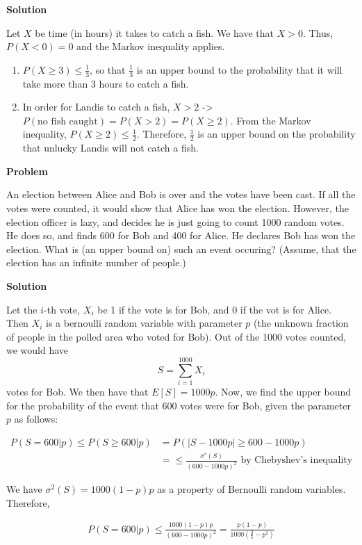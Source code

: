 \documentclass[11pt]{article}
\newcounter{problem}
\newcounter{solution}
\newcommand\Problem{%
  \stepcounter{problem}%
  \textbf{Problem \theproblem}~%
  \setcounter{solution}{0}%
}
\newcommand\TheSolution{%
  \textbf{Solution}\:\:%
}
\begin{document}
  \TheSolution
  Let $X$ be time (in hours) it takes to catch a fish. We have that $X>0$. Thus,
  $P(X<0)=0$ and the Markov inequality applies.
  \begin{enumerate}
  \item $P(X\geq 3)\leq \frac{1}{3}$, so that $\frac{1}{3}$ is an upper bound to
    the probability that it will take more than 3 hours to catch a fish.
  \item In order for Landis to catch a fish, $X > 2$ -> $P(\text{no fish
      caught}) = P(X>2) = P(X \geq 2)$. From the Markov inequality, $P(X \geq 2)
    \leq \frac{1}{2}$. Therefore, $\frac{1}{2}$ is an upper bound on the
    probability that unlucky Landis will not catch a fish.
  \end{enumerate}

  \newpage
  \Problem
  An election between Alice and Bob is over and the votes have been cast. If all
  the votes were counted, it would show that Alice has won the election. However,
  the election officer is lazy, and decides he is just going to count 1000 random
  votes. He does so, and finds 600 for Bob and 400 for Alice. He declares Bob has
  won the election. What is (an upper bound on) such an event occuring? (Assume,
  that the election has an infinite number of people.)

  \TheSolution

  Let the $i$-th vote, $X_i$ be 1 if the vote is for Bob, and 0 if the vot is for
  Alice. Then $X_i$ is a bernoulli random variable with parameter $p$ (the unknown
  fraction of people in the polled area who voted for Bob). Out of the 1000 votes
  counted, we would have $$S=\sum_{i=1}^{1000}X_i$$ votes for Bob. We then have
  that $E[S] = 1000p$. Now, we find the upper bound for the probability of the
  event that 600 votes were for Bob, given the parameter $p$ as follows:

  \begin{align}
    P(S=600|p)\leq P(S\geq600|p) &= P(|S-1000p| \geq 600 - 1000p) \\
                                 &= \leq \frac{\sigma^s(S)}{(600-1000p)^2} \text{ by Chebyshev's inequality}
  \end{align}

  We have $\sigma^2(S)=1000(1-p)p$ as a property of Bernoulli random
  variables. Therefore,

  \begin{align}
    P(S=600|p)\leq \frac{1000(1-p)p}{(600-1000p)^2} = \frac{p(1-p)}{1000\left(\frac{3}{5}-p^2\right)}
  \end{align}
\end{document}
